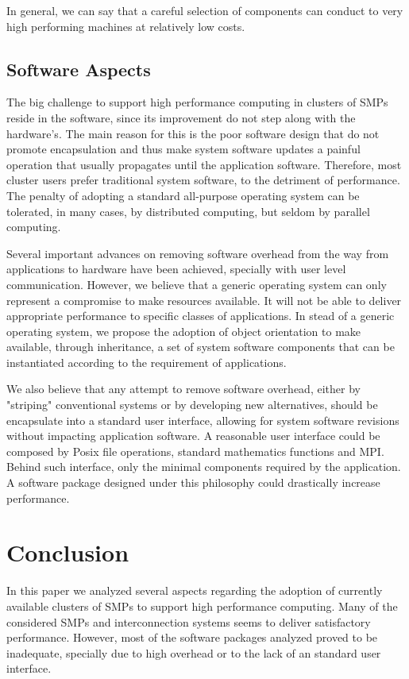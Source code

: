	In general, we can say that a careful selection of components can conduct to very high performing machines at relatively low costs.
	

\subsection{Software Aspects}

	The big challenge to support high performance computing in clusters of SMPs reside in the software, since its improvement do not step along with the hardware's. The main reason for this is the poor software design that do not promote encapsulation and thus make system software updates a painful operation that usually propagates until the application software. Therefore, most cluster users prefer traditional system software, to the detriment of performance. The penalty of adopting a standard all-purpose operating system can be tolerated, in many cases, by distributed computing, but seldom by parallel computing.
	
	Several important advances on removing software overhead from the way from applications to hardware have been achieved, specially with user level communication. However, we believe that a generic operating system can only represent a compromise to make resources available. It will not be able to deliver appropriate performance to specific classes of applications. In stead of a generic operating system, we propose the adoption of object orientation to make available, through inheritance, a set of system software components that can be instantiated according to the requirement of applications.

	We also believe that any attempt to remove software overhead, either by "striping" conventional systems or by developing new alternatives, should be encapsulate into a standard user interface, allowing for system software revisions without impacting application software. A reasonable user interface could be composed by Posix file operations, standard mathematics functions and MPI. Behind such interface, only the minimal components required by the application. A software package designed under this philosophy could drastically increase performance.
	
		
\section{Conclusion}

	In this paper we analyzed several aspects regarding the adoption of currently available clusters of SMPs to support high performance computing. Many of the considered SMPs and interconnection systems seems to deliver satisfactory performance. However, most of the software packages analyzed proved to be inadequate, specially due to high overhead or to the lack of an standard user interface.
	
